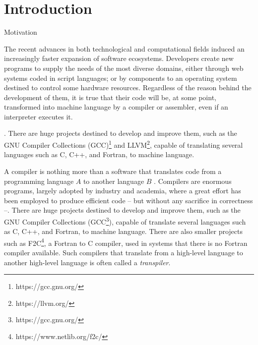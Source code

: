 \chapter{Introduction}
\label{cap:introducao}

\begin{section}{Motivation}\label{sec:motivation}

The recent advances in both technological and computational fields induced an
increasingly faster expansion of software ecosystems. Developers create new
programs to supply the needs of the most diverse domains, either through web
systems coded in script languages; or by components to an operating system
destined to control some hardware resources. Regardless of the reason behind
the development of them, it is true that their code will be, at some
point, transformed into machine language by a compiler or assembler, even if an
interpreter executes it.



. There are huge projects destined
to develop and improve them, such as the GNU Compiler Collections
(GCC)\footnote{https://gcc.gnu.org/} and LLVM\footnote{https://llvm.org/}, capable
of translating several languages such as C, C++, and Fortran, to machine language.

A compiler is nothing more than a software that translates code from a
programming language $A$ to another language $B$ \citep{dragonbook}.
Compilers are enormous programs, largely adopted by industry and academia, where
a great effort has been employed to produce efficient code --
but without any sacrifice in correctness --. There are huge projects destined to
develop and improve them, such as the GNU Compiler Collections
(GCC\footnote{https://gcc.gnu.org/}), capable of translate several languages
such as C, C++, and Fortran, to machine language. There are also smaller
projects such as F2C\footnote{https://www.netlib.org/f2c/}, a Fortran to C
compiler, used in systems that there is no Fortran compiler available. Such
compilers that translate from a high-level language to another high-level
language is often called a \textit{transpiler}.


\end{section}
